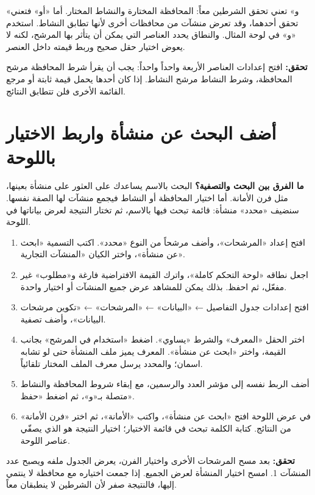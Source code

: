 «و» تعني تحقق الشرطين معاً: المحافظة المختارة والنشاط المختار. أما «أو» فتعني تحقق أحدهما، وقد تعرض منشآت من محافظات أخرى لأنها تطابق النشاط. استخدم «و» في لوحة المثال. والنطاق يحدد العناصر التي يمكن أن يتأثر بها المرشح، لكنه لا يعوض اختيار حقل صحيح وربط قيمته داخل العنصر.

\textbf{تحقق:} افتح إعدادات العناصر الأربعة واحداً واحداً: يجب أن يقرأ شرط المحافظة مرشح المحافظة، وشرط النشاط مرشح النشاط. إذا كان أحدها يحمل قيمة ثابتة أو مرجع القائمة الأخرى فلن تتطابق النتائج.

\section{أضف البحث عن منشأة واربط الاختيار باللوحة}
\label{sec:build-dashboard-search}

\textbf{ما الفرق بين البحث والتصفية؟} البحث بالاسم يساعدك على العثور على منشأة بعينها، مثل فرن الأمانة. أما اختيار المحافظة أو النشاط فيجمع منشآت لها الصفة نفسها. سنضيف «محدد» منشأة: قائمة تبحث فيها بالاسم، ثم تختار النتيجة لعرض بياناتها في اللوحة.

\begin{enumerate}
\item افتح إعداد «المرشحات»، وأضف مرشحاً من النوع «محدد». اكتب التسمية «ابحث عن منشأة»، واختر الكيان «المنشآت التجارية».
\item اجعل نطاقه «لوحة التحكم كاملة»، واترك القيمة الافتراضية فارغة و«مطلوب» غير مفعّل، ثم احفظ. بذلك يمكن للمشاهد عرض جميع المنشآت أو اختيار واحدة.
\item افتح إعدادات جدول التفاصيل ← «البيانات» ← «المرشحات» ← «تكوين مرشحات البيانات»، وأضف تصفية.
\item اختر الحقل «المعرف» والشرط «يساوي». اضغط «استخدام في المرشح» بجانب القيمة، واختر «ابحث عن منشأة». المعرف يميز ملف المنشأة حتى لو تشابه اسمان؛ والمحدد يرسل معرف الملف المختار تلقائياً.
\item أضف الربط نفسه إلى مؤشر العدد والرسمين، مع إبقاء شروط المحافظة والنشاط متصلة بـ«و»، ثم اضغط «حفظ».
\item في عرض اللوحة افتح «ابحث عن منشأة»، واكتب «الأمانة»، ثم اختر «فرن الأمانة» من النتائج. كتابة الكلمة تبحث في قائمة الاختيار؛ اختيار النتيجة هو الذي يصفّي عناصر اللوحة.
\end{enumerate}

\textbf{تحقق:} بعد مسح المرشحات الأخرى واختيار الفرن، يعرض الجدول ملفه ويصبح عدد المنشآت 1. امسح اختيار المنشأة لعرض الجميع. إذا جمعت اختياره مع محافظة لا ينتمي إليها، فالنتيجة صفر لأن الشرطين لا ينطبقان معاً.

